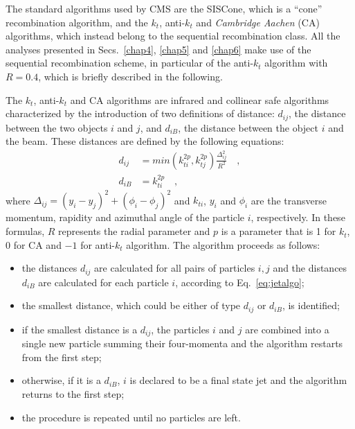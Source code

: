 The standard algorithms used by CMS are the SISCone, which is a ``cone'' recombination algorithm, and the $k_t$, anti-$k_t$ and \emph{Cambridge Aachen} (CA) algorithms, which instead belong to the sequential recombination class.
All the analyses presented in Secs.~\ref{chap4}, \ref{chap5} and \ref{chap6} make use of the sequential recombination scheme, in particular of the anti-$k_t$ algorithm with $R=0.4$, which is briefly described in the following.

The $k_t$, anti-$k_t$ and CA algorithms are infrared and collinear safe algorithms characterized by the introduction of two definitions of distance: $d_{ij}$, the distance between the two objects $i$ and $j$, and $d_{iB}$, the distance between the object $i$ and the beam. These distances are defined by the following equations:
\begin{equation}\label{eq:jetalgo}
\begin{split}
d_{ij} &= min\left(k_{ti}^{2p}, k_{tj}^{2p} \right) \frac{\Delta_{ij}^2}{R^2} \quad,\\
d_{iB} &= k_{ti}^{2p} \quad,
\end{split}
\end{equation}
where $\Delta_{ij} = (y_i - y_j)^2 + (\phi_i - \phi_j)^2$ and $k_{ti}$, $y_i$ and $\phi_i$ are the transverse momentum, rapidity and azimuthal angle of the particle $i$, respectively. In these formulas, $R$ represents the radial parameter and $p$ is a parameter that is 1 for $k_t$, 0 for CA and $-1$ for anti-$k_t$ algorithm. The algorithm proceeds as follows:
\begin{itemize}
\item the distances $d_{ij}$ are calculated for all pairs of particles $i,j$ and the distances $d_{iB}$ are calculated for each particle $i$, according to Eq.~\eqref{eq:jetalgo};
\item the smallest distance, which could be either of type $d_{ij}$ or $d_{iB}$, is identified;
\item if the smallest distance is a $d_{ij}$, the particles $i$ and $j$ are combined into a single new particle summing their four-momenta and the algorithm restarts from the first step;
\item otherwise, if it is a $d_{iB}$, $i$ is declared to be a final state jet and the algorithm returns to the first step;
\item the procedure is repeated until no particles are left.
\end{itemize}


